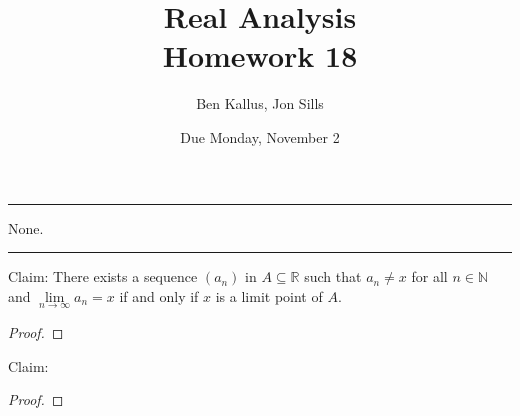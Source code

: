 \documentclass[12pt]{article}
\title{Real Analysis \\ Homework 18}
\author{Ben Kallus, Jon Sills}
\date{Due Monday, November 2}
\begin{document}
\pagecolor{black}
\color{white}
\maketitle

\hrule
\bigskip

 None.

\bigskip
\hrule
\bigskip

 Claim: There exists a sequence $(a_n)$ in $A \subseteq \mathbb R$ such that $a_n \neq x$ for all $n \in \mathbb N$ and $\lim\limits_{n\to\infty}a_n=x$ if and only if $x$ is a limit point of $A$.
\begin{proof}

\end{proof}


\newpage
{} Claim:
\begin{proof}

\end{proof}
\end{document}
